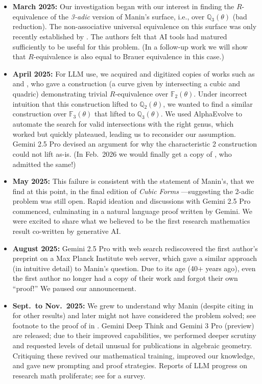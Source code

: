 \documentclass[11pt]{article}
\theoremstyle{definition}
\begin{document}
\begin{ai}
\begin{itemize}
  \item \textbf{March 2025:} Our investigation began with our interest in finding the $R$-equivalence of the \textit{3-adic} version of Manin's surface, i.e., over $\mathbb{Q}_3(\theta)$ (bad reduction). The non-associative universal equivalence on this surface was only recently established by \cite{dknonassoc, dknonassoc2}. The authors felt that AI tools had matured sufficiently to be useful for this problem. (In a follow-up work we will show that $R$-equivalence is also equal to Brauer equivalence in this case.)
  \item \textbf{April 2025:} For LLM use, we acquired and digitized copies of works such as \cite{dimitrikanevsky} and \cite[\S 8]{swinnertondyer}, who gave a construction (a curve given by intersecting a cubic and quadric) demonstrating trivial $R$-equivalence over $\mathbb{F}_2(\theta)$. Under incorrect intuition that this construction lifted to $\mathbb{Q}_2(\theta)$, we wanted to find a similar construction over $\mathbb{F}_3(\theta)$ that lifted to $\mathbb{Q}_3(\theta)$. We used AlphaEvolve \cite{alphaevolve} to automate the search for valid intersections with the right genus, which worked but quickly plateaued, leading us to reconsider our assumption. Gemini 2.5 Pro \cite{gemini} devised an argument for why the characteristic 2 construction could not lift as-is. (In Feb.\ 2026 we would finally get a copy of \cite{weak-approx}, who admitted the same!)
  \item \textbf{May 2025:} This failure is consistent with the statement of Manin's, that we find at this point, in the final edition of \textit{Cubic Forms} \cite{manin3}---suggesting the 2-adic problem was still open. Rapid ideation and discussions with Gemini 2.5 Pro commenced, culminating in a natural language proof written by Gemini.  We were excited to share what we believed to be the first research mathematics result co-written by generative AI.
  \item \textbf{August 2025:} Gemini 2.5 Pro with web search rediscovered the first author's preprint \cite{dkbrauer} on a Max Planck Institute web server, which gave a similar approach (in intuitive detail) to Manin's question. Due to its age (40+ years ago), even the first author no longer had a copy of their work and forgot their own ``proof!'' We paused our announcement.
  \item \textbf{Sept.\ to Nov.\ 2025:} We grew to understand why Manin (despite citing \cite{dkbrauer} in \cite{manin3} for other results) and later \cite{weak-approx} might not have considered the problem solved; see footnote to the proof of  in . Gemini Deep Think and Gemini 3 Pro (preview) are released; due to their improved capabilities, we performed deeper scrutiny and requested levels of detail unusual for publications in algebraic geometry. Critiquing these revived our mathematical training, improved our knowledge, and gave new prompting and proof strategies.  Reports of LLM progress on research math proliferate; see \cite[\S 7]{feng2026aletheia} for a survey.

\end{itemize}
\end{ai}
\end{document}
